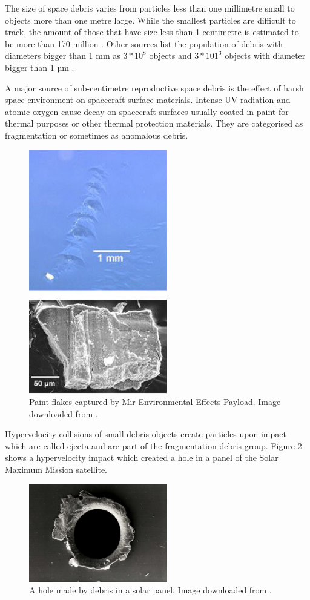 	The size of space debris varies from particles less than one millimetre small to objects more than one metre large. While the smallest particles are difficult to track, the amount of those that have size less than 1 centimetre is estimated to be more than 170 million \citep{esabr336}. Other sources list the population of debris with diameters bigger than 1 mm as $3*10^8$ objects and $3*101^3$ objects with diameter bigger than 1 µm \citep{klinkrad2006space}. 

	A major source of sub-centimetre reproductive space debris is the effect of harsh space environment on spacecraft surface materials. Intense UV radiation and atomic oxygen cause decay on spacecraft surfaces usually coated in paint for thermal purposes or other thermal protection materials. They are categorised as fragmentation or sometimes as anomalous debris.
	
\begin{figure}[H]
	\centering
  \includegraphics[width=6cm]{images/paintflakes}
  \caption{Paint flakes captured by Mir Environmental Effects Payload. Image downloaded from \citep{NASA}.}
  \label{fig:paintflakes}
\end{figure}
	
	Hypervelocity collisions of small debris objects create particles upon impact which are called ejecta and are part of the fragmentation debris group. Figure \ref{fig:hypervelocitycollision} shows a hypervelocity impact which created a hole in a panel of the Solar Maximum Mission satellite.
	
\begin{figure}[H]
\centering
  \includegraphics[width=6cm]{images/hypervelocitycollision}
  \caption{A hole made by debris in a solar panel. Image downloaded from \citep{NASA}.}
  \label{fig:hypervelocitycollision}
\end{figure}	
	
